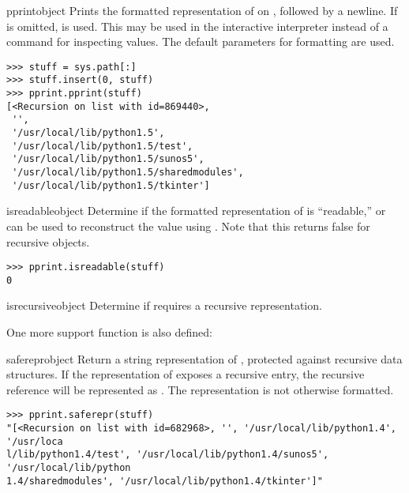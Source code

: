 \begin{funcdesc}{pprint}{object}
Prints the formatted representation of  on ,
followed by a newline.  If  is omitted, 
is used.  This may be used in the interactive interpreter instead of a
 command for inspecting values.  The default parameters
for formatting are used.

\begin{verbatim}
>>> stuff = sys.path[:]
>>> stuff.insert(0, stuff)
>>> pprint.pprint(stuff)
[<Recursion on list with id=869440>,
 '',
 '/usr/local/lib/python1.5',
 '/usr/local/lib/python1.5/test',
 '/usr/local/lib/python1.5/sunos5',
 '/usr/local/lib/python1.5/sharedmodules',
 '/usr/local/lib/python1.5/tkinter']
\end{verbatim}
\end{funcdesc}

\begin{funcdesc}{isreadable}{object}
Determine if the formatted representation of  is
``readable,'' or can be used to reconstruct the value using
.  Note that this returns false for recursive objects.

\begin{verbatim}
>>> pprint.isreadable(stuff)
0
\end{verbatim}
\end{funcdesc}

\begin{funcdesc}{isrecursive}{object}
Determine if  requires a recursive representation.
\end{funcdesc}


One more support function is also defined:

\begin{funcdesc}{saferepr}{object}
Return a string representation of , protected against
recursive data structures.  If the representation of 
exposes a recursive entry, the recursive reference will be represented
as .  The
representation is not otherwise formatted.

\begin{verbatim}
>>> pprint.saferepr(stuff)
"[<Recursion on list with id=682968>, '', '/usr/local/lib/python1.4', '/usr/loca
l/lib/python1.4/test', '/usr/local/lib/python1.4/sunos5', '/usr/local/lib/python
1.4/sharedmodules', '/usr/local/lib/python1.4/tkinter']"
\end{verbatim}
\end{funcdesc}


